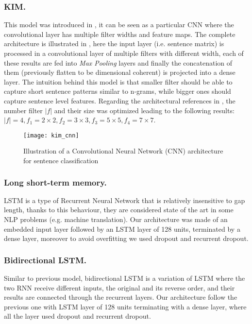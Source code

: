 \subsubsection{KIM.}
This model was introduced in \cite{kim2014convolutional}, it can be seen as a particular CNN where the convolutional layer has multiple filter widths and feature maps.
The complete architecture is illustrated in , here the input layer (i.e. sentence matrix) is processed in a convolutional layer of multiple filters with different width, each of these results are fed into \emph{Max Pooling} layers and finally the concatenation of them (previously flatten to be dimensional coherent) is projected into a dense layer.
The intuition behind this model is that smaller filter should be able to capture short sentence patterns similar to n-grams, while bigger ones should capture sentence level features.
Regarding the architectural references in \cite{kim2014convolutional}, the number filter $|f|$ and their size was optimized leading to the following results: $|f| = 4, f_1 = 2\times2, f_2 = 3\times3, f_3 = 5\times5, f_4 = 7\times7$.

\begin{figure}[h]
\footnotesize
\centering
\texttt{[image: kim\_cnn]}
\caption{\cite{zhang2015sensitivity} Illustration of a Convolutional Neural Network (CNN) architecture for sentence classification}
\label{fig:kim}
\end{figure}

\subsubsection{Long short-term memory.}
LSTM is a type of Recurrent Neural Network that is relatively insensitive to gap length, thanks to this behaviour, they are considered state of the art in some NLP problems (e.g. machine translation).
Our architecture was made of an embedded input layer followed by an LSTM layer of 128 units, terminated by a dense layer, moreover to avoid overfitting we used dropout and recurrent dropout.

\subsubsection{Bidirectional LSTM.} Similar to previous model, bidirectional LSTM is a variation of LSTM where the two RNN receive different inputs, the original and its reverse order, and their results are connected through the recurrent layers.
Our architecture follow the previous one with LSTM layer of 128 units terminating with a dense layer, where all the layer used dropout and recurrent dropout.

